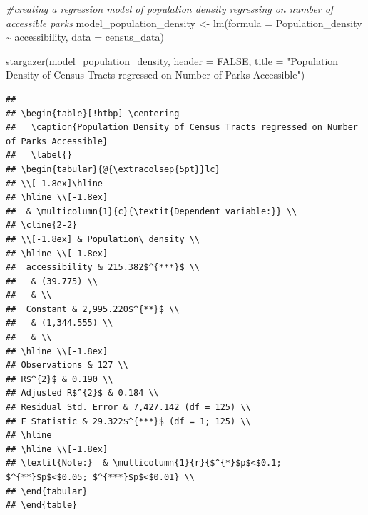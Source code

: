 \documentclass[
]{article}
\newenvironment{Shaded}{\begin{snugshade}}{\end{snugshade}}
\newcommand{\AttributeTok}[1]{\textcolor[rgb]{0.77,0.63,0.00}{#1}}
\newcommand{\CommentTok}[1]{\textcolor[rgb]{0.56,0.35,0.01}{\textit{#1}}}
\newcommand{\ConstantTok}[1]{\textcolor[rgb]{0.00,0.00,0.00}{#1}}
\newcommand{\FunctionTok}[1]{\textcolor[rgb]{0.00,0.00,0.00}{#1}}
\newcommand{\NormalTok}[1]{#1}
\newcommand{\OtherTok}[1]{\textcolor[rgb]{0.56,0.35,0.01}{#1}}
\newcommand{\SpecialCharTok}[1]{\textcolor[rgb]{0.00,0.00,0.00}{#1}}
\newcommand{\StringTok}[1]{\textcolor[rgb]{0.31,0.60,0.02}{#1}}
\begin{document}
\begin{Shaded}
\begin{Highlighting}[]
\CommentTok{\#creating a regression model of population density regressing on number of accessible parks}
\NormalTok{model\_population\_density }\OtherTok{\textless{}{-}} \FunctionTok{lm}\NormalTok{(}\AttributeTok{formula =}\NormalTok{ Population\_density }\SpecialCharTok{\textasciitilde{}}\NormalTok{ accessibility, }
             \AttributeTok{data =}\NormalTok{ census\_data)}

\FunctionTok{stargazer}\NormalTok{(model\_population\_density,}
          \AttributeTok{header =} \ConstantTok{FALSE}\NormalTok{,}
          \AttributeTok{title =} \StringTok{"Population Density of Census Tracts regressed on Number of Parks Accessible"}\NormalTok{)}
\end{Highlighting}
\end{Shaded}

\begin{verbatim}
## 
## \begin{table}[!htbp] \centering 
##   \caption{Population Density of Census Tracts regressed on Number of Parks Accessible} 
##   \label{} 
## \begin{tabular}{@{\extracolsep{5pt}}lc} 
## \\[-1.8ex]\hline 
## \hline \\[-1.8ex] 
##  & \multicolumn{1}{c}{\textit{Dependent variable:}} \\ 
## \cline{2-2} 
## \\[-1.8ex] & Population\_density \\ 
## \hline \\[-1.8ex] 
##  accessibility & 215.382$^{***}$ \\ 
##   & (39.775) \\ 
##   & \\ 
##  Constant & 2,995.220$^{**}$ \\ 
##   & (1,344.555) \\ 
##   & \\ 
## \hline \\[-1.8ex] 
## Observations & 127 \\ 
## R$^{2}$ & 0.190 \\ 
## Adjusted R$^{2}$ & 0.184 \\ 
## Residual Std. Error & 7,427.142 (df = 125) \\ 
## F Statistic & 29.322$^{***}$ (df = 1; 125) \\ 
## \hline 
## \hline \\[-1.8ex] 
## \textit{Note:}  & \multicolumn{1}{r}{$^{*}$p$<$0.1; $^{**}$p$<$0.05; $^{***}$p$<$0.01} \\ 
## \end{tabular} 
## \end{table}
\end{verbatim}
\end{document}
